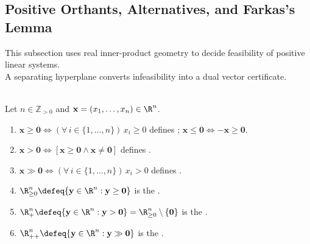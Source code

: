 \subsection{Positive Orthants, Alternatives, and Farkas's Lemma}

This subsection uses real inner-product geometry to decide feasibility of positive linear systems.\\
A separating hyperplane converts infeasibility into a dual vector certificate.

\begin{definition} \label{def:positive-vector-orders-orthants} \\
Let $n\in\mathbb{Z}_{>0}$ and $\mathbf{x}=(x_1,\ldots,x_n)\in\R^n$.
\begin{enumerate}[label=(\roman*)]
\setlength{\itemsep}{0pt}
\item $\mathbf{x}\geq\mathbf{0}\Longleftrightarrow(\forall\,i\in\{1,\ldots,n\})\,x_i\geq0$ defines ; $\mathbf{x}\leq\mathbf{0}\Longleftrightarrow-\mathbf{x}\geq\mathbf{0}$.
\item $\mathbf{x}>\mathbf{0}\Longleftrightarrow[\mathbf{x}\geq\mathbf{0}\land\mathbf{x}\neq\mathbf{0}]$ defines .
\item $\mathbf{x}\gg\mathbf{0}\Longleftrightarrow(\forall\,i\in\{1,\ldots,n\})\,x_i>0$ defines .
\item $\R_{\geq0}^n\defeq\{\mathbf{y}\in\R^n:\mathbf{y}\geq\mathbf{0}\}$ is the .
\item $\R_+^n\defeq\{\mathbf{y}\in\R^n:\mathbf{y}>\mathbf{0}\}=\R_{\geq0}^n\setminus\{\mathbf{0}\}$ is the .
\item $\R_{++}^n\defeq\{\mathbf{y}\in\R^n:\mathbf{y}\gg\mathbf{0}\}$ is the .
\end{enumerate}
\end{definition}

